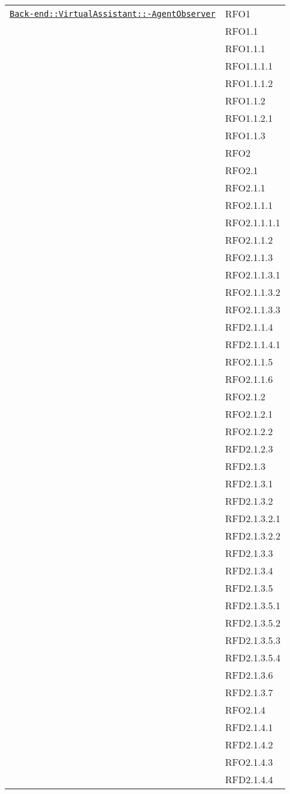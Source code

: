 \begin{longtable}{|>{\centering}m{10cm}|m{3cm}<{\centering}|}
\hyperref[Back-end::VirtualAssistant::AgentObserver]{\texttt{Back-end::VirtualAssistant::-\linebreak AgentObserver}} & RFO1\\
& RFO1.1\\
& RFO1.1.1\\
& RFO1.1.1.1\\
& RFO1.1.1.2\\
& RFO1.1.2\\
& RFO1.1.2.1\\
& RFO1.1.3\\
& RFO2\\
& RFO2.1\\
& RFO2.1.1\\
& RFO2.1.1.1\\
& RFO2.1.1.1.1\\
& RFO2.1.1.2\\
& RFO2.1.1.3\\
& RFO2.1.1.3.1\\
& RFO2.1.1.3.2\\
& RFO2.1.1.3.3\\
& RFD2.1.1.4\\
& RFD2.1.1.4.1\\
& RFO2.1.1.5\\
& RFO2.1.1.6\\
& RFO2.1.2\\
& RFO2.1.2.1\\
& RFO2.1.2.2\\
& RFD2.1.2.3\\
& RFD2.1.3\\
& RFD2.1.3.1\\
& RFD2.1.3.2\\
& RFD2.1.3.2.1\\
& RFD2.1.3.2.2\\
& RFD2.1.3.3\\
& RFD2.1.3.4\\
& RFD2.1.3.5\\
& RFD2.1.3.5.1\\
& RFD2.1.3.5.2\\
& RFD2.1.3.5.3\\
& RFD2.1.3.5.4\\
& RFD2.1.3.6\\
& RFD2.1.3.7\\
& RFO2.1.4\\
& RFD2.1.4.1\\
& RFD2.1.4.2\\
& RFO2.1.4.3\\
& RFD2.1.4.4\\

\end{longtable}

